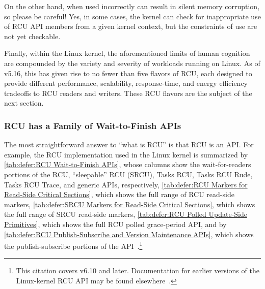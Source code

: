 On the other hand, when used incorrectly  can
result in silent memory corruption, so please be careful!
Yes, in some cases, the kernel can check for inappropriate use of
RCU API members from a given kernel context, but the constraints of
 use are not yet checkable.

Finally, within the Linux kernel, the aforementioned limits of human
cognition are compounded by the variety and severity of workloads running
on Linux.
As of v5.16, this has given rise to no fewer than five flavors of
RCU, each designed to provide different performance, scalability,
response-time, and energy efficiency tradeoffs to RCU readers and writers.
These RCU flavors are the subject of the next section.

\subsubsection{RCU has a Family of Wait-to-Finish APIs}
\label{sec:defer:RCU has a Family of Wait-to-Finish APIs}

The most straightforward answer to ``what is RCU'' is that RCU is
an API\@.
For example, the RCU implementation used in the Linux kernel is
summarized by
\cref{tab:defer:RCU Wait-to-Finish APIs},
whose columns show the wait-for-readers portions of the RCU, ``sleepable''
RCU (SRCU), Tasks RCU, Tasks RCU Rude, Tasks RCU Trace, and generic APIs,
respectively,
\cref{tab:defer:RCU Markers for Read-Side Critical Sections},
which shows the full range of RCU read-side markers,
\cref{tab:defer:SRCU Markers for Read-Side Critical Sections},
which shows the full range of SRCU read-side markers,
\cref{tab:defer:RCU Polled Update-Side Primitives},
which shows the full RCU polled grace-period API,
and by
\cref{tab:defer:RCU Publish-Subscribe and Version Maintenance APIs},
which shows the publish-subscribe portions of the
API~\cite{PaulEMcKenney2024RCUAPI}.\footnote{
	This citation covers v6.10 and later.
	Documentation for earlier versions of the Linux-kernel RCU API may
	be found elsewhere~\cite{PaulEMcKenney2008WhatIsRCUAPI,PaulEMcKenney2014RCUAPI,PaulEMcKenney2019RCUAPI}.}

